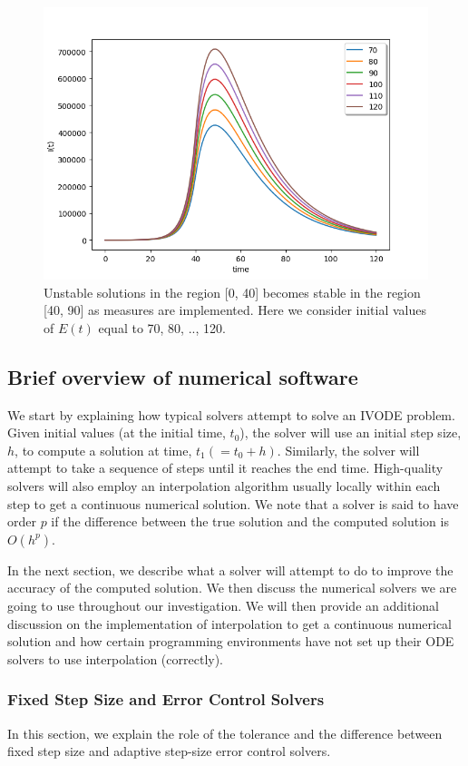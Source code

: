 \begin{figure}[H]
\centering
\includegraphics[width=0.7\linewidth]{./figures/regain_stability_after_measures}
\caption{Unstable solutions in the region [0, 40] becomes stable in the region [40, 90] as measures are implemented. Here we consider initial values of $E(t)$ equal to 70, 80, .., 120.}
\label{fig:regain_stability_after_measures}
\end{figure}

\subsection{Brief overview of numerical software}
We start by explaining how typical solvers attempt to solve an IVODE problem. Given initial values (at the initial time, $t_0$), the solver will use an initial step size, $h$, to compute a solution at time, $t_1 (= t_0 + h)$. Similarly, the solver will attempt to take a sequence of steps until it reaches the end time. High-quality solvers will also employ an interpolation algorithm usually locally within each step to get a continuous numerical solution. We note that a solver is said to have order $p$ if the difference between the true solution and the computed solution is $O(h^p)$.

In the next section, we describe what a solver will attempt to do to improve the accuracy of the computed solution. We then discuss the numerical solvers we are going to use throughout our investigation. We will then provide an additional discussion on the implementation of interpolation to get a continuous numerical solution and how certain programming environments have not set up their ODE solvers to use interpolation (correctly).

\subsubsection{Fixed Step Size and Error Control Solvers}
\label{subsection:fixed_vs_control}
In this section, we explain the role of the tolerance and the difference between fixed step size and adaptive step-size error control solvers.

